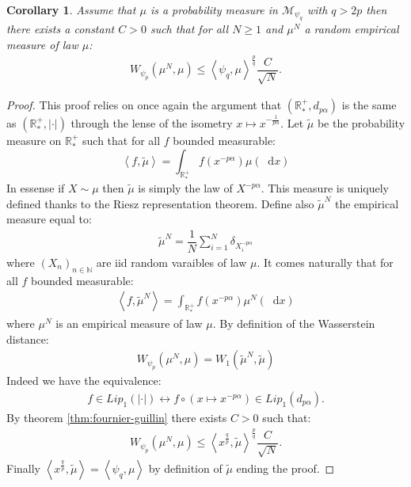 \documentclass[11pt,a4paper]{article}
\newcommand{\RRP}{\mathbb{R}^+_*}
\newcommand{\MC}{\mathcal{M}}
\newcommand{\Seq}[1]{\left(#1\right)_{n\in \mathbb{N}}}
\newcommand{\brac}[1]{\left\langle#1\right\rangle}
\newcommand{\dd}{\mathop{}\!\mathrm{d}}
\newtheorem{corollary}[theorem]{Corollary}
\begin{document}
\begin{corollary}\label{cor:fournier_guillin}
    Assume that $\mu$ is a probability measure in $\MC_{\psi_q}$ with $q > 2p$ then there exists a constant $C>0$ such that for all $N \geq 1$ and $\mu^N$ a random empirical measure of law $\mu$:
    \begin{align*}
        W_{\psi_p}\left(\mu^N,\mu \right) \leq \brac{\psi_q,\mu}^{\frac{p}{q}}  \dfrac{C}{\sqrt{N}}.
    \end{align*} 
\end{corollary}
\begin{proof}
    This proof relies on once again the argument that $\left(\RRP,d_{p\alpha}\right)$ is the same as $\left(\RRP,|\cdot|\right)$ through the lense of the isometry $x \mapsto x^{-\frac{1}{p\alpha}}$. Let $\tilde{\mu}$ be the probability measure on $\RRP$ such that for all $f$ bounded measurable:
    \[\brac{f,\tilde{\mu}} = \int_{\RRP} f(x^{-p\alpha}) \mu(\dd x)\]
    In essense if $X \sim \mu$ then $\tilde{\mu}$ is simply the law of $X^{-p\alpha}$. This measure is uniquely defined thanks to the Riesz representation theorem. Define also $\tilde{\mu}^N$ the empirical measure equal to:
    \begin{align*}
        \tilde{\mu}^N = \dfrac{1}{N} \sum\limits_{i = 1}^N \delta_{X_i^{-p\alpha}}
    \end{align*}
    where $\Seq{X_n}$ are iid random varaibles of law $\mu$. It comes naturally that for all $f$ bounded measurable:
    \begin{align*}
        \brac{f,\tilde{\mu}^N} = \int_{\RRP} f(x^{-p\alpha}) \mu^N(\dd x)
    \end{align*}
    where $\mu^N$ is  an empirical measure of law $\mu$. By definition of the Wasserstein distance:
    \begin{align*}
        W_{\psi_p}\left(\mu^N,\mu\right) = W_1\left(\tilde{\mu}^N,\tilde{\mu}\right)  
    \end{align*}
    Indeed we have the equivalence:
    \begin{align*}
        f \in Lip_1(|\cdot|) \leftrightarrow f\circ(x \mapsto x^{-p\alpha}) \in Lip_1(d_{p\alpha}).
    \end{align*}
    By theorem \ref{thm:fournier-guillin} there exists $C > 0$ such that:
    \begin{align*}
        W_{\psi_p}\left(\mu^N,\mu\right) \leq \brac{x^{\frac{q}{p}},\tilde{\mu}}^{\frac{p}{q}} \dfrac{C}{\sqrt{N}}.
    \end{align*}
    Finally $\brac{x^{\frac{q}{p}},\tilde{\mu}} = \brac{\psi_q,\mu}$ by definition of $\tilde{\mu}$ ending the proof.
\end{proof}
\end{document}
